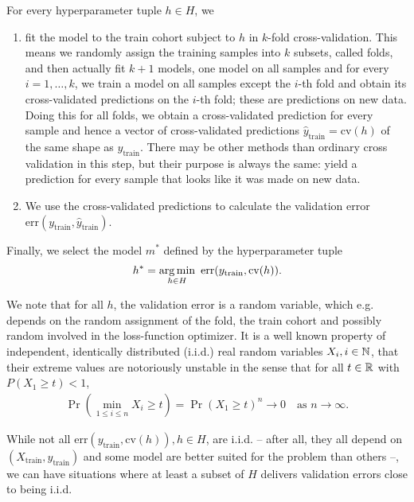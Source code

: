 For every hyperparameter tuple $h \in H$, we
\begin{enumerate}
    \item fit the model to the train cohort subject to $h$ in $k$-fold cross-validation. This means 
        we randomly assign the training samples into $k$ subsets, called folds, and then actually 
        fit $k+1$ models, one model on all samples and for every $i = 1, \ldots, k$, we train a model
        on all samples except the $i$-th fold and obtain its cross-validated predictions on the 
        $i$-th fold; these are predictions on new data. Doing this for all folds, we obtain a 
        cross-validated prediction for every sample and hence a vector of cross-validated predictions
        $\hat{y}_\text{train} = \text{cv}(h)$ of the same shape as $y_\text{train}$. There may be 
        other methods than ordinary cross
        validation in this step, but their purpose is always the same: yield a prediction for every 
        sample that looks like it was made on new data.
    \item We use the cross-validated predictions to calculate the validation error 
        $\text{err}(y_\text{train}, \hat{y}_\text{train})$.
\end{enumerate}

Finally, we select the model $m^*$ defined by the hyperparameter tuple 
\begin{align}
    h^* = \operatorname*{arg\,min}_{h \in H} \ \text{err}(y_\text{train}, \text{cv}(h)).
\end{align}

We note that for all $h$, the validation error is a random variable, which e.g. depends on the 
random assignment of the fold, the train cohort and possibly random involved in the loss-function
optimizer. It is a well known property of independent,
identically distributed (i.i.d.) real random variables $X_i, i \in \mathbb{N}$, that their extreme values 
are notoriously unstable in the sense that for all $t \in \mathbb{R}$ with $P(X_1 \geq t) < 1$, 
\begin{align}
    \Pr\left( \min_{1 \leq i \leq n} X_i \geq t \right) = \Pr(X_1 \geq t)^n \to 0 \quad
    \text{as } n \to \infty.
\end{align}

While not all $\text{err}(y_\text{train}, \text{cv}(h)), h \in H$, are i.i.d. -- after all, they 
all depend on 
$(X_\text{train}, y_\text{train})$ and some model are better suited for the problem than others --,
we can have situations where at least a subset of $H$ delivers validation errors close to being i.i.d.

